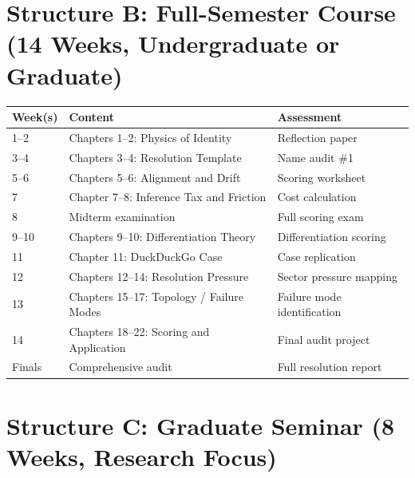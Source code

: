 \documentclass[12pt, openany]{book}
\theoremstyle{thmstyle}
\theoremstyle{defstyle}
\begin{document}
\section*{Structure B: Full-Semester Course (14 Weeks, Undergraduate or Graduate)}

\begin{center}
\begin{tabular}{lll}
\toprule
\textbf{Week(s)} & \textbf{Content} & \textbf{Assessment} \\
\midrule
1--2 & Chapters 1--2: Physics of Identity & Reflection paper \\
3--4 & Chapters 3--4: Resolution Template & Name audit \#1 \\
5--6 & Chapters 5--6: Alignment and Drift & Scoring worksheet \\
7 & Chapter 7--8: Inference Tax and Friction & Cost calculation \\
8 & Midterm examination & Full scoring exam \\
9--10 & Chapters 9--10: Differentiation Theory & Differentiation scoring \\
11 & Chapter 11: DuckDuckGo Case & Case replication \\
12 & Chapters 12--14: Resolution Pressure & Sector pressure mapping \\
13 & Chapters 15--17: Topology / Failure Modes & Failure mode identification \\
14 & Chapters 18--22: Scoring and Application & Final audit project \\
Finals & Comprehensive audit & Full resolution report \\
\bottomrule
\end{tabular}
\end{center}

\section*{Structure C: Graduate Seminar (8 Weeks, Research Focus)}
\end{document}
